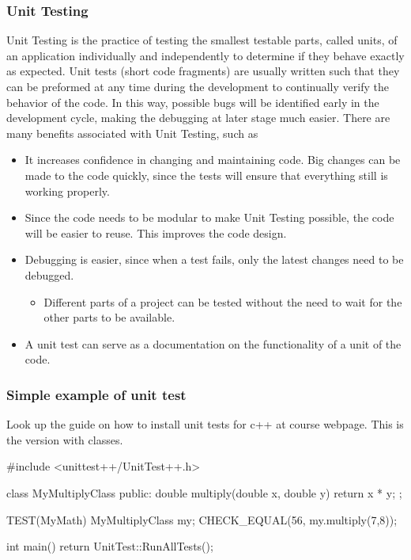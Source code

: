 \documentclass[handout]{beamer}
\newenvironment{block_mdfboxadmon}[1][]{\begin{block}{#1}}{\end{block}}
\begin{document}
\begin{frame}
\frametitle{Unit Testing}

\begin{block_mdfboxadmon}[]
Unit Testing is the practice of testing the smallest testable parts,
called units, of an application individually and independently to
determine if they behave exactly as expected. Unit tests (short code
fragments) are usually written such that they can be preformed at any
time during the development to continually verify the behavior of the
code. In this way, possible bugs will be identified early in the
development cycle, making the debugging at later stage much
easier. There are many benefits associated with Unit Testing, such as
\begin{itemize}
  \item It increases confidence in changing and maintaining code. Big changes can be made to the code quickly, since the tests will ensure that everything still is working properly.

  \item Since the code needs to be modular to make Unit Testing possible, the code will be easier to reuse. This improves the code design.

  \item Debugging is easier, since when a test fails, only the latest changes need to be debugged.
\begin{itemize}

   \item Different parts of a project can be tested without the need to wait for the other parts to be available.

\end{itemize}

\noindent
  \item A unit test can serve as a documentation on the functionality of a unit of the code.
\end{itemize}

\noindent
\end{block_mdfboxadmon}
\end{frame}

\begin{frame}
\frametitle{Simple example of unit test}

\begin{block_mdfboxadmon}[]
Look up the guide on how to install unit tests for c++ at course webpage. This is the version with classes.
\begin{print}
#include <unittest++/UnitTest++.h>

class MyMultiplyClass{
public:
    double multiply(double x, double y) {
        return x * y;
    }
};

TEST(MyMath) {
    MyMultiplyClass my;
    CHECK_EQUAL(56, my.multiply(7,8));
}

int main()
{
    return UnitTest::RunAllTests();
}
\end{print}
\end{block_mdfboxadmon}
\end{frame}
\end{document}

